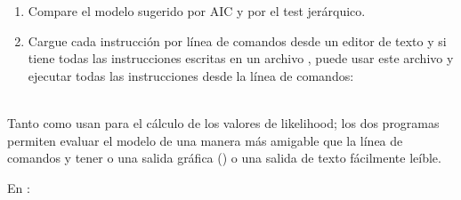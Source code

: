 \begin{enumerate}
	\item Compare el modelo sugerido por AIC y por el test jer\'arquico.

	\item Cargue cada instrucci\'on por l\'inea de comandos desde un editor de texto y si tiene todas las instrucciones escritas en un archivo , puede usar este archivo y ejecutar todas las instrucciones desde la l\'inea de comandos:
	
\end{enumerate}



\\
Tanto  como  usan  para el c\'alculo de los valores de likelihood; los dos programas permiten evaluar el modelo de una manera m\'as amigable que la l\'inea de comandos y tener o una salida gr\'afica () o una salida de texto f\'acilmente le\'ible.




En :

